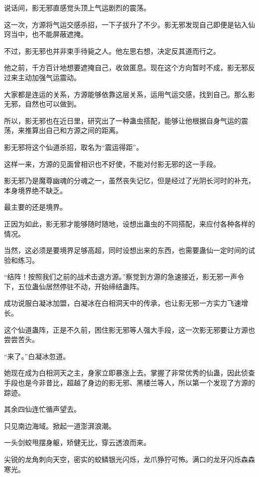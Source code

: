 
\begin{this_body}



说话间，影无邪直感觉头顶上气运剧烈的震荡。

这一次，方源将气运交感杀招，一下子拔升了不少。影无邪发现自己即便是钻入仙窍当中，也不能屏蔽遮掩。

不过，影无邪也并非束手待毙之人。他左思右想，决定反其道而行之。

他之前，千方百计地想要遮掩自己，收敛匿息。现在这个方向暂时不成，影无邪反过来主动加强气运震动。

大家都是连运的关系，方源能够依靠这层关系，运用气运交感，找到自己。那么影无邪，自然也可以做到。

所以，影无邪也在近日里，研究出了一种蛊虫搭配，能够让他根据自身气运的震荡，来推算出自己和方源之间的距离。

影无邪将这个仙道杀招，取名为“震运得距”。

这样一来，方源的见面曾相识也不好使，不能对付影无邪的这一手段。

影无邪乃是魔尊幽魂的分魂之一，虽然丧失记忆，但是经过了光阴长河时的补充，本身境界绝不缺乏。

最主要的还是境界。

正因为如此，影无邪才能够随时随地，设想出蛊虫的不同搭配，来应付各种各样的情况。

当然，这必须是要境界足够高超，同时设想出来的东西，也需要蛊仙一定时间的试验和练习。

“结阵！按照我们之前的战术击退方源。”察觉到方源的急速接近，影无邪一声令下，五位蛊仙居然停驻不动，开始缔结蛊阵。

成功说服白凝冰加盟，白凝冰在白相洞天中的传承，也让影无邪一方实力飞速增长。

这个仙道蛊阵，正是不久前，困住影无邪等人强大手段，这一次影无邪要让方源也尝尝苦头。

“来了。”白凝冰忽道。

她现在成为白相洞天之主，身家立即暴涨上去。掌握了非常优秀的仙蛊，因此侦查手段也是今非昔比，超越了身边的影无邪、黑楼兰等人，所以第一个发现了方源的踪迹。

其余四仙连忙循声望去。

只见南边海域。掀起一道澎湃浪潮。

一头剑蛟甩摆身躯，矫健无比，穿云透浪而来。

尖锐的龙角刺向天空，密实的蛟鳞银光闪烁，龙爪狰狞可怖。满口的龙牙闪烁森森寒光。


\end{this_body}
